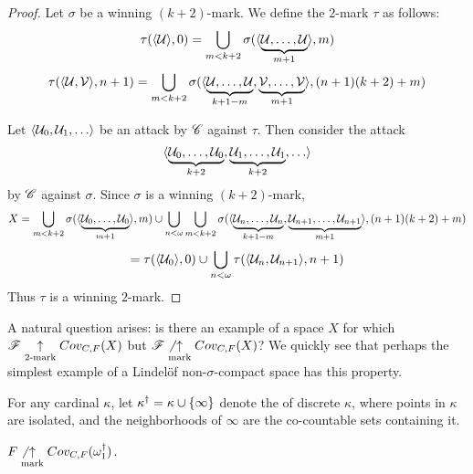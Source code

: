 \begin{proof}
  Let $\sigma$ be a winning $(k+2)$-mark. We define the $2$-mark $\tau$ as
  follows:
    \[
      \tau(\langle\mathcal{U}\rangle,0)
        =
      \bigcup_{m<k+2}
        \sigma(\langle\underbrace{\mathcal{U},\dots,\mathcal{U}}_{m+1}\rangle,m)
    \]
    \[
      \tau(\langle\mathcal{U},\mathcal{V}\rangle,n+1)
        =
      \bigcup_{m<k+2}
        \sigma(\langle
          \underbrace{\mathcal{U},\dots,\mathcal{U}}_{k+1-m},
          \underbrace{\mathcal{V},\dots,\mathcal{V}}_{m+1}
        \rangle,(n+1)(k+2)+m)
    \]

  Let $\<\mc U_0,\mc U_1,\dots\>$ be an attack by $\mathscr{C}$ against $\tau$.
  Then consider the attack
    \[
      \<
        \underbrace{\mc U_0,\dots,\mc U_0}_{k+2},
        \underbrace{\mc U_1,\dots,\mc U_1}_{k+2},
        \dots
      \>
    \]
  by $\mathscr{C}$ against $\sigma$. Since $\sigma$ is a winning $(k+2)$-mark,
    \[
      X
        =
      \bigcup_{m<k+2}
        \sigma(\langle\underbrace{\mathcal{U}_0,\dots,\mathcal{U}_0}_{m+1}\rangle,m)
      \cup
      \bigcup_{n<\omega}
      \bigcup_{m<k+2}
        \sigma(\langle
          \underbrace{\mathcal{U}_n,\dots,\mathcal{U}_n}_{k+1-m},
          \underbrace{\mathcal{U}_{n+1},\dots,\mathcal{U}_{n+1}}_{m+1}
        \rangle,(n+1)(k+2)+m)
    \]
    \[
      =
      \tau(\langle\mathcal{U}_0\rangle,0)
      \cup
      \bigcup_{n<\omega}
      \tau(\langle\mathcal{U}_n,\mathcal{U}_{n+1}\rangle,n+1)
    \]
  Thus $\tau$ is a winning $2$-mark.
\end{proof}

A natural question arises: is there an example of a space $X$ for which
$\mathscr{F}\underset{2\text{-mark}}{\uparrow}Cov_{C,F}(X)$ but $\mathscr{F}\not\underset{\text{mark}}{\uparrow}Cov_{C,F}(X)$? We quickly
see that perhaps the simplest example of a Lindel\"of non-$\sigma$-compact
space has this property.

\begin{defn}
  For any cardinal $\kappa$, let $\kappa^\dagger=\kappa\cup\{\infty\}$ denote
  the  of discrete $\kappa$, where points in
  $\kappa$ are isolated, and the neighborhoods of $\infty$ are the co-countable
  sets containing it.
\end{defn}

\begin{thm}
  $F\not\underset{\text{mark}}{\uparrow}Cov_{C,F}(\omega_1^\dagger)$.
\end{thm}

